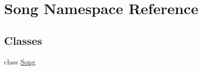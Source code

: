 \hypertarget{namespace_song}{}\section{Song Namespace Reference}
\label{namespace_song}
\subsection*{Classes}
\begin{DoxyCompactItemize}
\item 
class \hyperlink{class_song_1_1_song}{Song}
\end{DoxyCompactItemize}
